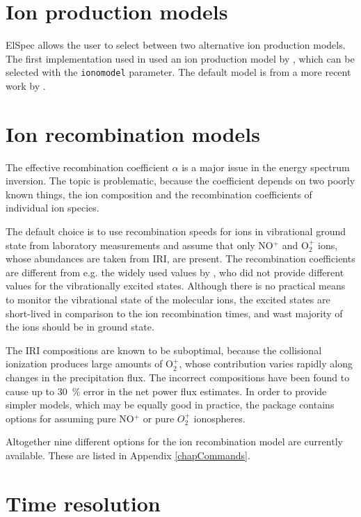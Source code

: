 \documentclass[12pt,a4paper]{report}
\begin{document}
\section{Ion production models}

ElSpec allows the user to select between two alternative ion production models. The first implementation used in \cite{dahlgren2011} used an ion production model by \citep{sergienko1993}, which can be selected with the \verb|ionomodel| parameter. The default model is from a more recent work by \citep{fang2010}. 


\section{Ion recombination models}

The effective recombination coefficient $\alpha$ is a major issue in the energy spectrum inversion. The topic is problematic, because the coefficient depends on two poorly known things, the ion composition and the recombination coefficients of individual ion species. 

The default choice is to use recombination speeds for ions in vibrational ground state from laboratory measurements \citep{sheehan2004} and assume that only NO$^+$ and O$_2^+$ ions, whose abundances are taken from IRI, are present.  The recombination coefficients are different from e.g. the widely used values by \cite{rees1989}, who did not provide different values for the vibrationally excited states. Although there is no practical means to monitor the vibrational state of the molecular ions, the excited states are short-lived in comparison to the ion recombination times, and wast majority of the ions should be in ground state. 

The IRI compositions are known to be suboptimal, because the collisional ionization produces large amounts of O$_2^+$, whose contribution varies rapidly along changes in the precipitation flux. The incorrect compositions have been found to cause up to 30~\% error in the net power flux estimates. In order to provide simpler models, which may be equally good in practice, the package contains options for assuming pure NO$^+$ or pure $O_2^+$ ionospheres. 

Altogether nine different options for the ion recombination model are currently available. These are listed in Appendix \ref{chapCommands}.

\section{Time resolution}
\end{document}
